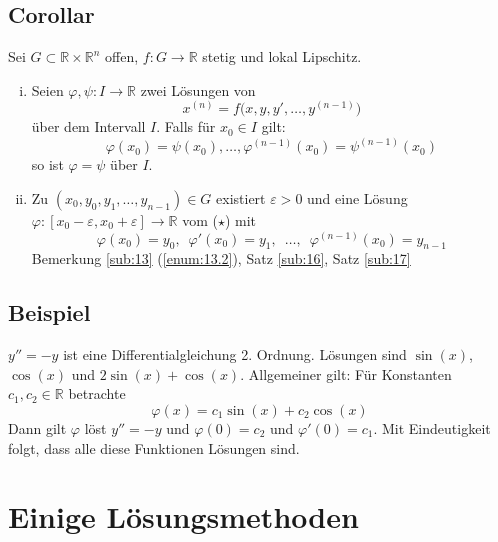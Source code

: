 \subsection[Corollar: Folgerungen aus dem Eindeutigkeits- und  Existenzsatz]{Corollar} %
\label{sub:19}
Sei $G \subset \mathds{R} \times \mathds{R}^n$ offen, $f : G \to \mathds{R}$ stetig und lokal Lipschitz.
\begin{enumerate}[(i)]
	\item Seien $\varphi, \psi : I \to \mathds{R}$ zwei Lösungen von 
	\[
		x^{(n)}= f\big(x, y, y', \ldots , y^{(n-1)}\big) \tag{$\star$}
	\]
	über dem Intervall $I$. Falls für $x_0 \in I$ gilt:
	\[
		\varphi(x_0)= \psi(x_0), \ldots , \varphi^{(n-1)}(x_0) = \psi^{(n-1)}(x_0)
	\]
	so ist $\varphi=\psi$ über $I$.
	\item Zu $(x_0, y_0, y_1, \ldots , y_{n-1}) \in G$ existiert $\varepsilon>0$ und eine Lösung $\varphi : [x_0 -\varepsilon, x_0 +\varepsilon] \to \mathds{R}$ vom 
	($\star$) mit 
	\[
		\varphi(x_0) = y_0, \enspace\varphi'(x_0)=y_1, \enspace\ldots , \enspace \varphi^{(n-1)}(x_0) = y_{n-1} 
	\]
	Bemerkung \ref{sub:13} (\ref{enum:13.2}), Satz \ref{sub:16}, Satz \ref{sub:17} \bewende
\end{enumerate}

\subsection[Beispiel: Winkelfunktionen als Lösungen]{Beispiel} %
\label{sub:110}
$y''=-y$ ist eine Differentialgleichung 2. Ordnung. Lösungen sind $\sin(x)$, $\cos(x)$ und $ 2 \sin(x)+ \cos(x)$. Allgemeiner gilt: Für Konstanten $c_1, c_2 \in \mathds{R}$ betrachte 
\[
	\varphi(x) = c_1 \sin(x)+ c_2 \cos(x)
\]
Dann gilt $\varphi$ löst $y''=-y$ und $\varphi(0)=c_2$ und $\varphi'(0)=c_1$. Mit Eindeutigkeit folgt, dass alle diese Funktionen Lösungen sind.
\newpage
\section{Einige Lösungsmethoden} %
\label{sec:2}

